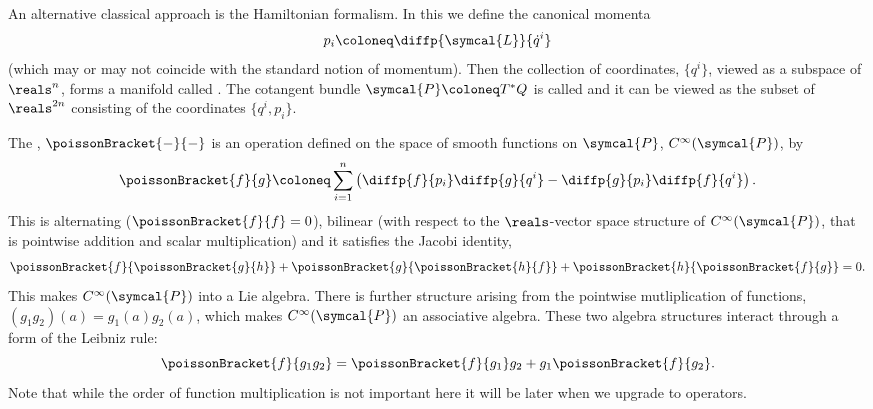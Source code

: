\documentclass[fleqn]{NotesClass}
\newcommand{\lagrangian}{\symcal{L}}
\newcommand{\phaseSpace}{\symcal{P}}
\begin{document}
    An alternative classical approach is the Hamiltonian formalism.
    In this we define the canonical momenta
    \begin{equation}
        p_i \coloneq \diffp{\lagrangian}{\dot{q}^i}
    \end{equation}
    (which may or may not coincide with the standard notion of momentum).
    Then the collection of coordinates, \(\{q^i\}\), viewed as a subspace of \(\reals^n\), forms a manifold called .
    The cotangent bundle \(\phaseSpace \coloneq T^*Q\) is called  and it can be viewed as the subset of \(\reals^{2n}\) consisting of the coordinates \(\{q^i, p_i\}\).
    
    The , \(\poissonBracket{-}{-}\) is an operation defined on the space of smooth functions on \(\phaseSpace\), \(C^{\infty}(\phaseSpace)\), by
    \begin{equation}
        \poissonBracket{f}{g} \coloneq \sum_{i=1}^{n} \left( \diffp{f}{p_i}\diffp{g}{q^i} - \diffp{g}{p_i}\diffp{f}{q^i} \right).
    \end{equation}
    This is alternating (\(\poissonBracket{f}{f} = 0\)), bilinear (with respect to the \(\reals\)-vector space structure of \(C^{\infty}(\phaseSpace)\), that is pointwise addition and scalar multiplication) and it satisfies the Jacobi identity,
    \begin{equation}
        \poissonBracket{f}{\poissonBracket{g}{h}} + \poissonBracket{g}{\poissonBracket{h}{f}} + \poissonBracket{h}{\poissonBracket{f}{g}} = 0.
    \end{equation}
    This makes \(C^{\infty}(\phaseSpace)\) into a Lie algebra.
    There is further structure arising from the pointwise mutliplication of functions, \((g_1g_2)(a) = g_1(a)g_2(a)\), which makes \(C^{\infty}(\phaseSpace)\) an associative algebra.
    These two algebra structures interact through a form of the Leibniz rule:
    \begin{equation}
        \poissonBracket{f}{g_1g_2} = \poissonBracket{f}{g_1}g_2 + g_1\poissonBracket{f}{g_2}.
    \end{equation}
    Note that while the order of function multiplication is not important here it will be later when we upgrade to operators.
    
\end{document}
